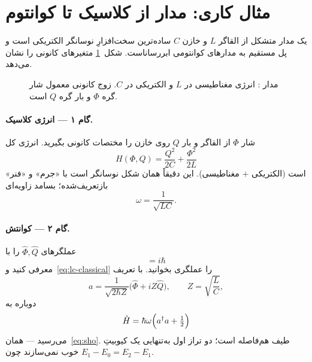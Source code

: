 \section{مثال کاری: مدار  از کلاسیک تا کوانتوم}
\label{sec:lc-quantize}

یک مدار متشکل از القاگر $L$ و خازن $C$ ساده‌ترین سخت‌افزارِ نوسانگر الکتریکی است و پل مستقیم به مدارهای کوانتومی ابررساناست. شکل~\ref{fig:lc-circuit} متغیرهای کانونی را نشان می‌دهد.

\begin{figure}[htbp]
	\centering
	\begin{latin}
		\resizebox{0.85\textwidth}{!}{%
		}
	\end{latin}
	\caption{مدار : انرژی مغناطیسی در $L$ و الکتریکی در $C$. زوج کانونی معمول شار گره $\Phi$ و بار گره $Q$ است.}
	\label{fig:lc-circuit}
\end{figure}

\paragraph{گام ۱ --- انرژی کلاسیک.}
شار $\Phi$ از القاگر و بار $Q$ روی خازن را مختصات کانونی بگیرید. انرژی کل
\begin{equation}
	\label{eq:lc-classical}
	H(\Phi,Q)
	=
	\frac{Q^2}{2C}
	+
	\frac{\Phi^2}{2L}
\end{equation}
است (الکتریکی $+$ مغناطیسی). این دقیقاً همان شکل نوسانگر است با «جرم» و «فنر» بازتعریف‌شده؛ بسامد زاویه‌ای
\begin{equation}
	\omega = \frac{1}{\sqrt{LC}}.
\end{equation}

\paragraph{گام ۲ --- کوانتش.}
عملگرهای $\hat\Phi,\hat Q$ را با
\begin{equation}
	[\hat\Phi,\hat Q]=i\hbar
\end{equation}
معرفی کنید و~\eqref{eq:lc-classical} را عملگری بخوانید. با تعریف
\begin{equation}
	a
	=
	\frac{1}{\sqrt{2\hbar Z}}
	\bigl(\hat\Phi + i Z\hat Q\bigr),
	\qquad
	Z=\sqrt{\frac{L}{C}},
\end{equation}
دوباره به
\begin{equation}
	\hat H = \hbar\omega\Bigl(a^\dagger a+\tfrac12\Bigr)
\end{equation}
می‌رسید --- همان~\eqref{eq:sho}. طیف هم‌فاصله است؛ دو تراز اول به‌تنهایی یک کیوبیتِ خوب نمی‌سازند چون $E_1-E_0=E_2-E_1$.

